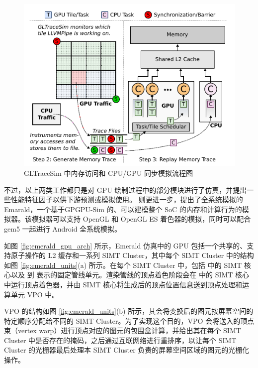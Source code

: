 \begin{figure}
    \centering
    \includegraphics{figures/GLTraceSim.pdf}
    \caption{GLTraceSim 中内存访问和 CPU/GPU 同步模拟流程图\cite{8167756}}
    \label{fig:gltracesim}
\end{figure}


不过，以上两类工作都只是对 GPU 绘制过程中的部分模块进行了仿真，并提出一些性能特征因子以供下游预测或模拟使用。\citet{10.1145/3307650.3322221} 则更进一步，提出了全系统模拟的 Emarald，一个基于GPGPU-Sim \cite{4919648} 的、可以建模整个 SoC 的内存和计算行为的模拟器。该模拟器可以支持 OpenGL 和 OpenGL ES 着色器的模拟，同时可以配合 gem5 一起进行 Android 全系统模拟。

如图 \ref{fig:emerald_gpu_arch} 所示，Emerald 仿真中的 GPU 包括一个共享的、支持原子操作的 L2 缓存和一系列 SIMT Cluster，其中每个 SIMT Cluster 中的结构如图 \ref{fig:emerald_units}(a) 所示。在每个 SIMT Cluster 中，包括  中的 SIMT 核心以及  到  表示的固定管线单元。渲染管线的顶点着色阶段会在  中的 SIMT 核心中运行顶点着色器，并由 SIMT 核心将生成后的顶点位置信息送到顶点处理和运算单元 VPO 中。

VPO 的结构如图 \ref{fig:emerald_units}(b) 所示，其会将变换后的图元按屏幕空间的特定顺序分配给不同的 SIMT Cluster。为了实现这个目的，VPO 会将送入的顶点束（vertex warp）进行顶点对应的图元的包围盒计算，并给出其在每个 SIMT Cluster 中是否存在的掩码，之后通过互联网络进行重排序，以让每个 SIMT Cluster 的光栅器最后处理本 SIMT Cluster 负责的屏幕空间区域的图元的光栅化操作。

